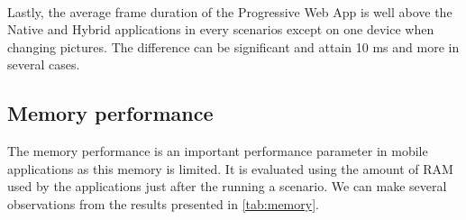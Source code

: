 \documentclass{kththesis}
\begin{document}
\paragraph{}
Lastly, the average frame duration of the Progressive Web App is well above the Native and Hybrid applications in every scenarios except on one device when changing pictures. The difference can be significant and attain 10 ms and more in several cases. 

\subsection{Memory performance}

The memory performance is an important performance parameter in mobile applications as this memory is limited. It is evaluated using the amount of RAM used by the applications just after the running a scenario. We can make several observations from the results presented in \autoref{tab:memory}. 
\end{document}
